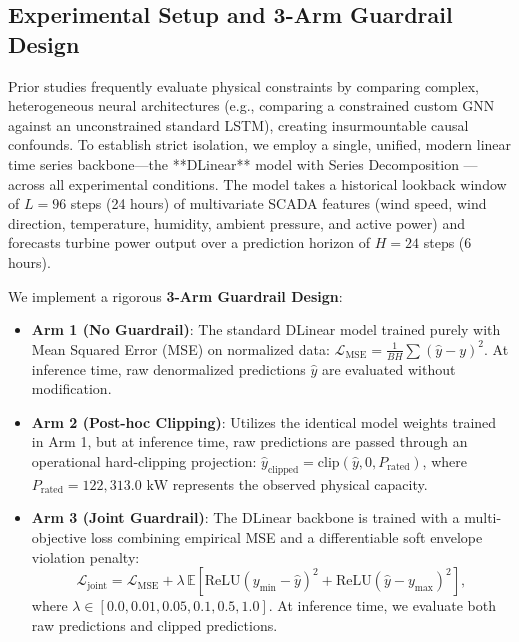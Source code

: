 \documentclass[preprint,3p,times]{elsarticle}
\begin{document}
\subsection{Experimental Setup and 3-Arm Guardrail Design}
Prior studies frequently evaluate physical constraints by comparing complex, heterogeneous neural architectures (e.g., comparing a constrained custom GNN against an unconstrained standard LSTM), creating insurmountable causal confounds. To establish strict isolation, we employ a single, unified, modern linear time series backbone---the **DLinear** model with Series Decomposition \cite{zeng2023dlinear}---across all experimental conditions. The model takes a historical lookback window of $L=96$ steps (24 hours) of multivariate SCADA features (wind speed, wind direction, temperature, humidity, ambient pressure, and active power) and forecasts turbine power output over a prediction horizon of $H=24$ steps (6 hours).

We implement a rigorous \textbf{3-Arm Guardrail Design}:
\begin{itemize}[leftmargin=1.5em]
    \item \textbf{Arm 1 (No Guardrail)}: The standard DLinear model trained purely with Mean Squared Error (MSE) on normalized data: $\mathcal{L}_{\text{MSE}} = \frac{1}{BH}\sum (\hat{y} - y)^2$. At inference time, raw denormalized predictions $\hat{y}$ are evaluated without modification.
    \item \textbf{Arm 2 (Post-hoc Clipping)}: Utilizes the identical model weights trained in Arm 1, but at inference time, raw predictions are passed through an operational hard-clipping projection: $\hat{y}_{\text{clipped}} = \text{clip}(\hat{y}, 0, P_{\text{rated}})$, where $P_{\text{rated}} = 122,313.0\text{ kW}$ represents the observed physical capacity.
    \item \textbf{Arm 3 (Joint Guardrail)}: The DLinear backbone is trained with a multi-objective loss combining empirical MSE and a differentiable soft envelope violation penalty:
    \begin{equation}
    \mathcal{L}_{\text{joint}} = \mathcal{L}_{\text{MSE}} + \lambda \, \mathbb{E}\left[ \text{ReLU}(y_{\min} - \hat{y})^2 + \text{ReLU}(\hat{y} - y_{\max})^2 \right],
    \label{eq:joint_guardrail}
    \end{equation}
    where $\lambda \in [0.0, 0.01, 0.05, 0.1, 0.5, 1.0]$. At inference time, we evaluate both raw predictions and clipped predictions.
\end{itemize}
\end{document}
